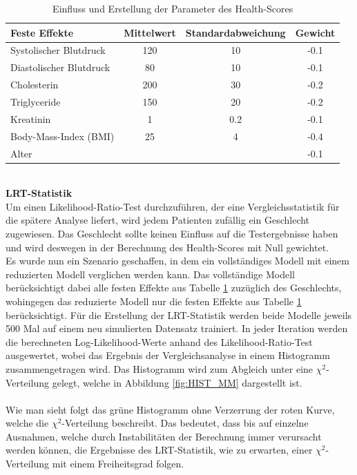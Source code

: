 \documentclass[%
thesis=student,%
coverpage=false,%
titlepage=false,%
headmarks=true, %
german,%
font=libertine, %
math=newpxtx, %
BCOR=5mm,%
coverBCOR=11mm%
]{tumbook}
\theoremstyle{break}
\begin{document}
\begin{table}[h]
	\centering
	\begin{tabular}{|l|c|c|c|}
		\hline
		\textbf{Feste Effekte} & \textbf{Mittelwert} & \textbf{Standardabweichung} & \textbf{Gewicht} \\
		\hline
		Systolischer Blutdruck  & 120 & 10 & -0.1\\ \hline
		Diastolischer Blutdruck & 80 & 10 & -0.1 \\ \hline
		Cholesterin  & 200 & 30 & -0.2 \\ \hline
		Triglyceride & 150 & 20 & -0.2  \\ \hline
		Kreatinin & 1 & 0.2 & -0.1 \\ \hline
		Body-Mass-Index (BMI) & 25 & 4 & -0.4 \\ \hline
		Alter & & & -0.1 \\ \hline
	\end{tabular}

	\caption{Einfluss und Erstellung der Parameter des Health-Scores}
	\label{tab:health_score_parameters}
\end{table}
\\
\textbf{LRT-Statistik}\\
Um einen Likelihood-Ratio-Test durchzuführen, der eine Vergleichsstatistik für die spätere Analyse liefert, wird jedem Patienten zufällig ein Geschlecht zugewiesen. Das Geschlecht sollte keinen Einfluss auf die Testergebnisse haben und wird deswegen in der Berechnung des Health-Scores mit Null gewichtet. \\
Es wurde nun ein Szenario geschaffen, in dem ein vollständiges Modell mit einem reduzierten Modell verglichen werden kann. Das vollständige Modell berücksichtigt dabei alle festen Effekte aus Tabelle \ref{tab:health_score_parameters} zuzüglich des Geschlechts, wohingegen das reduzierte Modell nur die festen Effekte aus Tabelle \ref{tab:health_score_parameters} berücksichtigt. Für die Erstellung der LRT-Statistik werden beide Modelle jeweils 500 Mal auf einem neu simulierten Datensatz trainiert. In jeder Iteration werden die berechneten Log-Likelihood-Werte anhand des Likelihood-Ratio-Test ausgewertet, wobei das Ergebnis der Vergleichsanalyse in einem Histogramm zusammengetragen wird. Das Histogramm wird zum Abgleich unter eine $\chi^2$-Verteilung gelegt, welche in Abbildung \ref{fig:HIST_MM} dargestellt ist. \\
\\
Wie man sieht folgt das grüne Histogramm ohne Verzerrung der roten Kurve, welche die $\chi^2$-Verteilung beschreibt. Das bedeutet, dass bis auf einzelne Ausnahmen, welche durch Instabilitäten der Berechnung immer verursacht werden können, die Ergebnisse des LRT-Statistik, wie zu erwarten, einer $\chi^2$-Verteilung mit einem Freiheitsgrad folgen. \\
\end{document}
